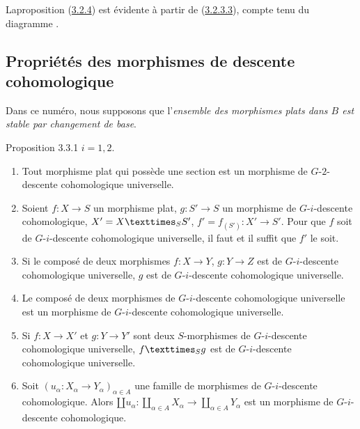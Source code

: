 \documentclass[10pt]{../fichiers-configuration-latex/smfart}
\begin{document}
La\pageoriginale proposition (\hyperref[Vbis.prop3.2.4]{3.2.4}) est évidente à
partir de (\hyperref[Vbis.lem3.2.3.3]{3.2.3.3}), compte tenu
du diagramme .

\subsection{Propriétés des morphismes de descente
  cohomologique}

Dans ce numéro, nous supposons que l'\emph{ensemble des morphismes
  plats dans $B$ est stable par changement de base}.

\begin{enonce*}{Proposition 3.3.1}
$i = 1, 2$.
\begin{enumerate}
\renewcommand{\theenumi}{\alph{enumi}}
\renewcommand{\labelenumi}{\theenumi)}
\item Tout morphisme plat qui possède une section est un morphisme de
  $G$-$2$-descente cohomologique universelle.

\item Soient $f : X \to S$ un morphisme plat, $g : S'\to S$ un
  morphisme de $G$-$i$-descente cohomologique, $X'= \fprod{X}{S'}{S}$,
  $f' = f_{(S')} : X'\to S'$. Pour que $f$ soit de $G$-$i$-descente
  cohomologique universelle, il faut et il suffit que $f'$ le soit.

\item Si le composé de deux morphismes $f : X \to Y$, $g : Y \to Z$
  est de $G$-$i$-descente cohomologique universelle, $g$ est de
  $G$-$i$-descente cohomologique universelle.

\item Le composé de deux morphismes de $G$-$i$-descente cohomologique
  universelle est un morphisme de $G$-$i$-descente cohomologique
  universelle.

\item Si $f : X \to X'$ et $g : Y \to Y'$ sont deux $S$-morphismes de
  $G$-$i$-descente cohomologique universelle, $\fprod{f}{g}{S}$ est de
  $G$-$i$-descente cohomologique universelle.

\item Soit $(u_{\alpha} : X_{\alpha} \to Y_{\alpha})_{\alpha \in A}$
  une famille de morphismes de $G$-$i$-descente cohomologique. Alors
  $\amalg u_{\alpha} : \amalg_{\alpha \in A}
  X_{\alpha} \to \amalg_{\alpha \in A}
  Y_{\alpha}$ est un morphisme de $G$-$i$-descente cohomologique.
\end{enumerate}
\end{enonce*}
\end{document}
